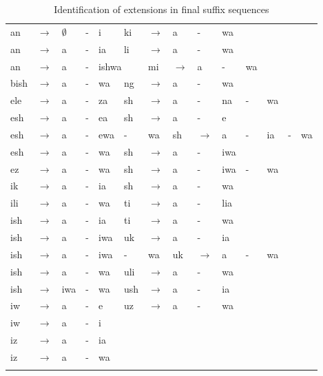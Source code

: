 \documentclass[output=paper,colorlinks,citecolor=brown]{langscibook}
\begin{document}
 
\begin{table}
\begin{tabular}{*{14}{l}}
\lsptoprule
an & $\to$ &$\emptyset$ &-& i &                   ki  & $\to$ &a  &-&   wa  \\
an & $\to$ & a&-& ia  &                           li  & $\to$ &a  &-&   wa \\
an & $\to$ & a&-& \multicolumn{2}{l}{ishwa}  &    mi  & $\to$ &a   &-&  wa \\
bish & $\to$ &  a&-& wa &                         ng  & $\to$ &a  &-&   wa  \\
ele  & $\to$ &a&-& za &                           sh  & $\to$ &a  &-&   na &-&  wa  \\
esh  & $\to$ &a&-& ea &                           sh  & $\to$ &a  &-&   e  \\
esh  & $\to$ &a &-& ewa &-& wa &                  sh  & $\to$ &a   &-&  ia  &-& wa \\
esh  & $\to$ &a&-& wa  &                          sh  & $\to$ &a   &-&  iwa \\
ez  & $\to$ &a&-& wa &                            sh  & $\to$ &a   &-&  iwa &-&  wa  \\	
ik  & $\to$ &a&-& ia  &                           sh  & $\to$ &a  &-&   wa \\
ili  & $\to$ &a &-&wa &                           ti  & $\to$ &a  &-&   lia \\
ish   & $\to$ &a &-&ia  &                         ti  & $\to$ &a  &-&   wa \\
ish  & $\to$ &a &-&iwa  &                         uk  & $\to$ &a  &-&   ia \\
ish  & $\to$ &a &-&iwa &-&wa &                    uk & $\to$ &a  &-&   wa \\
ish  & $\to$ &a &-&wa &                           uli  & $\to$ &a &-&    wa \\
ish  & $\to$ &iwa&-& wa & 	                      ush  & $\to$ &a  &-&  ia \\
iw  & $\to$ &a &-&e &                             uz  & $\to$ &a  &-&   wa \\
iw  & $\to$ & a &-&i  &                          \\
iz  & $\to$ &a &-&ia  &                          \\
iz  & $\to$ &a  &-&   wa &                       \\\lspbottomrule
\end{tabular}
\caption{Identification of extensions in final suffix sequences\label{finalstructure}}
\end{table}
\end{document}
